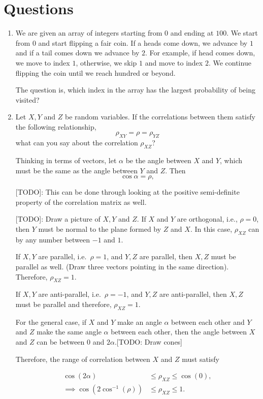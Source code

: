 \documentclass{amsart}
\theoremstyle{plain}
\numberwithin{equation}{section}
\begin{document}
\section*{Questions}
\begin{enumerate}
\item We are given an array of integers starting 
from $0$ and ending at $100$. We start from $0$ and 
start flipping a fair coin. If a heads come down, 
we advance by $1$ and if a tail comes down 
we advance by $2$. For example, if head comes down, we move
to index $1$, otherwise, we skip $1$ and move to index $2$. 
We continue flipping the coin until we 
reach hundred or beyond. 

The question is, which index in the array has the 
largest probability of being visited?  


 
\item Let $X, Y$ and $Z$ be random 
variables. If the correlations between 
them satisfy the following relationship,
$$\rho_{XY} = \rho = \rho_{YZ}$$
what can you say about the correlation
$\rho_{XZ}$?

Thinking in terms of vectors, let $\alpha$ be 
the angle between $X$ and $Y$, which must be the 
same as the angle between $Y$ and $Z$. Then
$$\cos \alpha = \rho,$$

[TODO]: This can be done through looking at
the positive semi-definite property of the correlation matrix as 
well.

[TODO]: Draw a picture of $X, Y$ and $Z$.
If $X$ and $Y$ are orthogonal, i.e., $\rho = 0$, 
then $Y$ must be normal to the plane 
formed by $Z$ and $X$. In this case, $\rho_{XZ}$ can 
by any number between $-1$ and $1$. 

If $X, Y$ are parallel, i.e.\ $\rho = 1$, and 
$Y, Z$ are parallel, then $X, Z$ must be parallel 
as well. (Draw three vectors pointing in the 
same direction). Therefore, $\rho_{XZ} = 1$.

If $X,Y$ are anti-parallel, i.e.\ $\rho = -1$, and 
$Y, Z$ are anti-parallel, then $X, Z$ must be 
parallel and therefore, $\rho_{XZ}=1$.

For the general case, if $X$ and $Y$ make an angle 
$\alpha$ between each other and $Y$ and $Z$ make the 
same angle $\alpha$ between each other, 
then the angle between $X$ and $Z$ can be between 
$0$ and $2\alpha$.[TODO: Draw cones]

Therefore, the range of correlation between 
$X$ and $Z$ must satisfy

\begin{align*}
\cos\left(2\alpha\right) &\leq \rho_{XZ} \leq \cos\left( 0 \right),\\
\implies \cos\left(2 \cos^{-1} \left(\rho\right) \right) & \leq \rho_{XZ} \leq 1.
\end{align*}


\end{enumerate}
\end{document}
